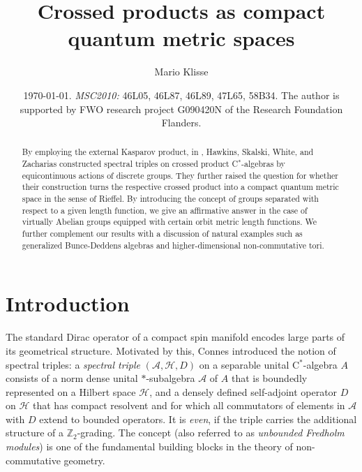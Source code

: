 \documentclass[a4paper,11pt,reqno]{amsart}
\numberwithin{equation}{section}
\numberwithin{equation}{section}
\theoremstyle{definition}
\theoremstyle{remark}
\theoremstyle{remark}
\begin{document}
\title{Crossed products as compact quantum metric spaces}


\author{Mario Klisse}

\address{KU Leuven, Department of Mathematics,
Celestijnenlaan 200B, 3001 Leuven, Belgium}



\begin{abstract}

By employing the external Kasparov product, in \cite{HSWZ13},  Hawkins, Skalski, White, and Zacharias constructed spectral triples on crossed product C$^\ast$-algebras by equicontinuous actions of discrete groups. They further raised the question for whether their construction turns the respective crossed product into a compact quantum metric space in the sense of Rieffel. By introducing the concept of groups separated with respect to a given length function, we give an affirmative answer in the case of virtually Abelian groups equipped with certain orbit metric length functions. We further complement our results with a discussion of natural examples such as generalized Bunce-Deddens algebras and higher-dimensional non-commutative tori.


\end{abstract}


\date{\today. \emph{MSC2010:}  46L05, 46L87, 46L89, 47L65, 58B34. The author is supported by FWO research project G090420N of the Research Foundation Flanders.}


\maketitle

\section*{Introduction}

\vspace{3mm}

The standard Dirac operator
of a compact spin manifold encodes large parts of its geometrical
structure. Motivated by this, Connes introduced the notion
of spectral triples: a \emph{spectral triple} $(\mathcal{A},\mathcal{H},D)$
on a separable unital C$^{\ast}$-algebra $A$ consists of a norm
dense unital $\ast$-subalgebra $\mathcal{A}$ of $A$ that is boundedly
represented on a Hilbert space $\mathcal{H}$, and a densely defined
self-adjoint operator $D$ on $\mathcal{H}$ that has compact resolvent
and for which all commutators of elements in $\mathcal{A}$ with $D$ extend
to bounded operators. It is \emph{even}, if the triple carries the
additional structure of a $\mathbb{Z}_{2}$-grading. The concept (also
referred to as \emph{unbounded Fredholm modules}) is one of the fundamental
building blocks in the theory of non-commutative geometry.
\end{document}
